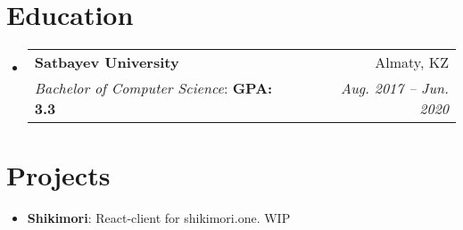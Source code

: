 \documentclass[letterpaper,11pt]{article}
\makeatletter
\newcommand{\resumeItem}[2]{
  \item\small{
    \textbf{#1}{: #2 \vspace{-2pt}}
  }
}
\newcommand{\resumeSubheading}[5]{
  \vspace{-1pt}\item
    \begin{tabular*}{0.97\textwidth}{l@{\extracolsep{\fill}}r}
      \textbf{#1} & #2 \\
      {\textit{\small#3}: \textbf{#4}} & \textit{\small #5} \\
    \end{tabular*}\vspace{-5pt}
}
\newcommand{\resumeSubItem}[2]{\resumeItem{#1}{#2}\vspace{-4pt}}
\newcommand{\resumeSubHeadingListStart}{\begin{itemize}[leftmargin=*]}
\newcommand{\resumeSubHeadingListEnd}{\end{itemize}}
\makeatother
\begin{document}
\section{Education}
  \resumeSubHeadingListStart
    \resumeSubheading
      {Satbayev University}{Almaty, KZ}
      {Bachelor of Computer Science}{GPA: 3.3}{Aug. 2017 -- Jun. 2020}
  \resumeSubHeadingListEnd


\section{Projects}
  \resumeSubHeadingListStart
    \resumeSubItem{Shikimori}
      {React-client for shikimori.one. WIP}
  \resumeSubHeadingListEnd


\end{document}
